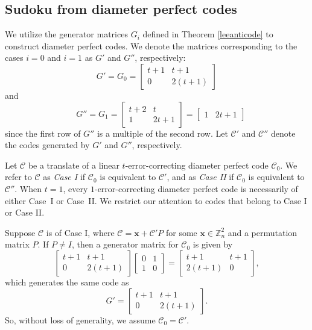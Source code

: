 \documentclass{article}
\theoremstyle{definition}
\begin{document}
\subsection{Sudoku from diameter perfect codes}
We utilize the generator matrices $G_i$ defined in Theorem \ref{leeanticode} to construct diameter perfect codes. We denote the matrices corresponding to the cases $i=0$ and $i=1$ as $G'$ and $G''$, respectively:
\[G' = G_0 = \begin{bmatrix} t+1 & t+1 \\ 0 & 2(t+1) \end{bmatrix}\]
and
\[\quad G'' = G_1 = \begin{bmatrix} t+2 & t \\ 1 & 2t+1 \end{bmatrix}= \begin{bmatrix} 1 & 2t+1 \end{bmatrix}\] since the first row of $G''$ is a multiple of the second row. Let $\mathcal{C}'$ and $\mathcal{C}''$ denote the codes generated by $G'$ and $G''$, respectively.

Let $\mathcal{C}$ be a translate of a linear $t$-error-correcting diameter perfect code $\mathcal{C}_0$. We refer to $\mathcal{C}$ as \textit{Case I} if $\mathcal{C}_0$ is equivalent to $\mathcal{C}'$, and as \textit{Case II} if $\mathcal{C}_0$ is equivalent to $\mathcal{C}''$. When $t=1$, every $1$-error-correcting diameter perfect code is necessarily of either Case~I or Case~II. We restrict our attention to codes that belong to Case I or Case II.

Suppose $\mathcal{C}$ is of Case I, where $\mathcal{C} = \mathbf{x} + \mathcal{C}'P$ for some $\mathbf{x} \in \mathbb{Z}_n^2$ and a permutation matrix $P$. If $P\ne I$, then a generator matrix for $\mathcal{C}_0$ is given by
\[
\begin{bmatrix} t+1 & t+1 \\ 0 & 2(t+1) \end{bmatrix}
\begin{bmatrix} 0 & 1 \\ 1 & 0 \end{bmatrix}=
\begin{bmatrix} t+1 & t+1 \\ 2(t+1) & 0 \end{bmatrix},
\]
which generates the same code as
\[G'=\begin{bmatrix} t+1 & t+1 \\ 0 & 2(t+1) \end{bmatrix}.\]
So, without loss of generality, we assume $\mathcal{C}_0=\mathcal{C}'$.
\end{document}
